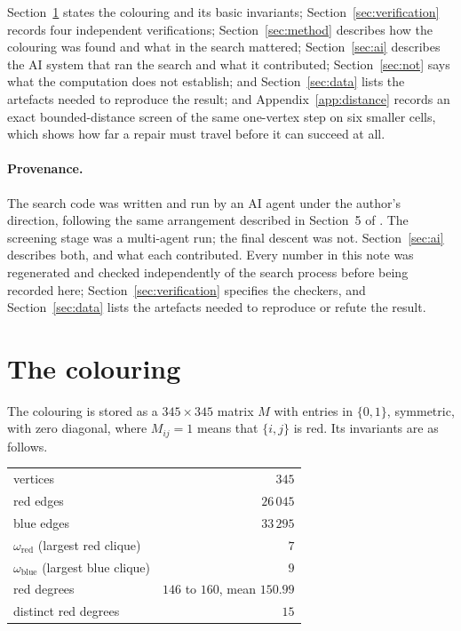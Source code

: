 \documentclass[11pt]{article}
\newcommand{\R}{R}
\newcommand{\omegared}{\omega_{\mathrm{red}}}
\newcommand{\omegablue}{\omega_{\mathrm{blue}}}
\begin{document}
\begin{center}
\fbox{\parbox{0.92\textwidth}{
\textbf{Theorem.} $\R(8,10)\ge 346$.
}}
\end{center}

Section~\ref{sec:colouring} states the colouring and its basic invariants;
Section~\ref{sec:verification} records four independent verifications;
Section~\ref{sec:method} describes how the colouring was found and what in the search mattered;
Section~\ref{sec:ai} describes the AI system that ran the search and what it contributed;
Section~\ref{sec:not} says what the computation does not establish; and
Section~\ref{sec:data} lists the artefacts needed to reproduce the result; and
Appendix~\ref{app:distance} records an exact bounded-distance screen of the same one-vertex step on
six smaller cells, which shows how far a repair must travel before it can succeed at all.

\paragraph{Provenance.}
The search code was written and run by an AI agent under the author's direction, following the same
arrangement described in Section~5 of \cite{cremer}. The screening stage was a multi-agent run; the
final descent was not. Section~\ref{sec:ai} describes both, and what each contributed. Every number
in this note was regenerated and checked independently of the search process before being recorded
here; Section~\ref{sec:verification} specifies the checkers, and Section~\ref{sec:data} lists the
artefacts needed to reproduce or refute the result.

\section{The colouring}\label{sec:colouring}

The colouring is stored as a $345\times 345$ matrix $M$ with entries in $\{0,1\}$, symmetric, with
zero diagonal, where $M_{ij}=1$ means that $\{i,j\}$ is red. Its invariants are as follows.

\begin{center}
\begin{tabular}{lr}
\toprule
vertices & $345$\\
red edges & $26\,045$\\
blue edges & $33\,295$\\
$\omegared$ (largest red clique) & $7$\\
$\omegablue$ (largest blue clique) & $9$\\
red degrees & $146$ to $160$, mean $150.99$\\
distinct red degrees & $15$\\
\bottomrule
\end{tabular}
\end{center}
\end{document}

